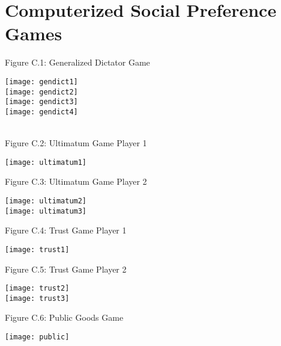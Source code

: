 \section{Computerized Social Preference Games}
\vspace{8mm} 
\begin{center}
Figure C.1: Generalized Dictator Game
\end{center}
\texttt{[image: gendict1]}\\
\texttt{[image: gendict2]}\\
\texttt{[image: gendict3]}\\
\texttt{[image: gendict4]}\\ \\
\newpage
\begin{center}
Figure C.2: Ultimatum Game Player 1
\end{center}
\texttt{[image: ultimatum1]} \\ 
\begin{center}
Figure C.3: Ultimatum Game Player 2 
\end{center}
\texttt{[image: ultimatum2]} \\
\texttt{[image: ultimatum3]} \\ 
\newpage
\begin{center}
Figure C.4: Trust Game Player 1
\end{center}
\texttt{[image: trust1]} \\ 
\begin{center}
Figure C.5: Trust Game Player 2
\end{center}
\texttt{[image: trust2]} \\
\texttt{[image: trust3]} \\ 
\newpage
\begin{center}
Figure C.6: Public Goods Game
\end{center}
\texttt{[image: public]} \\